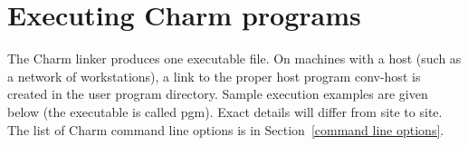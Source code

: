 %
%
%
%
%
%

\section[Executing Charm Programs]{Executing Charm programs}
\label{executing charm programs}

The Charm linker produces one executable file.  On machines with a host
(such as a network of workstations), a link to the proper host program
{\fexec conv-host} is created in the user program directory.  Sample
execution examples are given below (the executable is called {\fparm
pgm}). Exact details will differ from site to site.  The list of Charm
command line options is in Section~\ref{command line options}.

